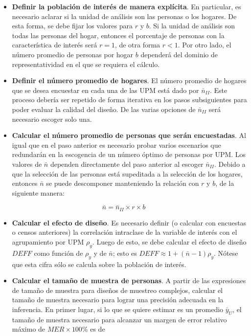 \documentclass[
  12pt,
  spanish,
]{book}
\begin{document}
\begin{itemize}
\item
  \textbf{Definir la población de interés de manera explícita}. En particular, es necesario aclarar si la unidad de análisis son las personas o los hogares. De esta forma, se debe fijar los valores para \(r\) y \(b\). Si la unidad de análisis son todas las personas del hogar, entonces el porcentaje de personas con la característica de interés será \(r = 1\), de otra forma \(r<1\). Por otro lado, el número promedio de personas por hogar \(b\) dependerá del dominio de representatividad en el que se requiera el cálculo.
\item
  \textbf{Definir el número promedio de hogares}. El número promedio de hogares que se desea encuestar en cada una de las UPM está dado por \(\bar{n}_{II}\). Este proceso debería ser repetido de forma iterativa en los pasos subsiguientes para poder evaluar la calidad del diseño. De las varias opciones de \(\bar{n}_{II}\) será necesario escoger solo una.
\item
  \textbf{Calcular el número promedio de personas que serán encuestadas}. Al igual que en el paso anterior es necesario probar varios escenarios que redundarán en la escogencia de un número óptimo de personas por UPM. Los valores de \(\bar{n}\) dependen directamente del paso anterior al escoger \(\bar{n}_{II}\). Debido a que la selección de las personas está supeditada a la selección de los hogares, entonces \(\bar{n}\) se puede descomponer manteniendo la relación con \(r\) y \(b\), de la siguiente manera:
\end{itemize}

\[
\bar{n} = \bar{n}_{II} \times r \times b
\]

\begin{itemize}
\item
  \textbf{Calcular el efecto de diseño}. Es necesario definir (o calcular con encuestas o censos anteriores) la correlación intraclase de la variable de interés con el agrupamiento por UPM \(\rho_y\). Luego de esto, se debe calcular el efecto de diseño \(DEFF\) como función de \(\rho_y\) y de \(\bar{n}\); esto es \(DEFF \approx 1 + (\bar{n} - 1)\rho_y\). Nótese que esta cifra sólo se calcula sobre la población de interés.
\item
  \textbf{Calcular el tamaño de muestra de personas}. A partir de las expresiones de tamaño de muestra para diseños de muestreo complejos, calcular el tamaño de muestra necesario para lograr una precisión adecuada en la inferencia. En primer lugar, si lo que se quiere estimar es un promedio \(\bar{y}_U\), el tamaño de muestra necesario para alcanzar un margen de error relativo máximo de \(MER \times 100\%\) es de
\end{itemize}
\end{document}
